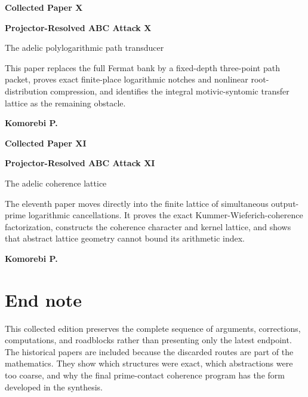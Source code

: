 \documentclass[11pt,openany]{book}
\theoremstyle{definition}
\theoremstyle{remark}
\newcommand{\PaperDivider}[4]{%
\clearpage
\thispagestyle{empty}
\vspace*{0.85in}
{\color{Blue}\Large\bfseries #1\par}
\vspace{0.16in}
{\Huge\bfseries #2\par}
\vspace{0.16in}
{\Large\color{Muted} #3\par}
\vspace{0.40in}
\begin{minipage}{0.88\textwidth}
\large #4
\end{minipage}
\vfill
{\large\bfseries Komorebi P.\par}
\clearpage}
\begin{document}
\PaperDivider{Collected Paper X}{Projector-Resolved ABC Attack X}{The adelic polylogarithmic path transducer}{This paper replaces the full Fermat bank by a fixed-depth three-point path packet, proves exact finite-place logarithmic notches and nonlinear root-distribution compression, and identifies the integral motivic-syntomic transfer lattice as the remaining obstacle.}


\PaperDivider{Collected Paper XI}{Projector-Resolved ABC Attack XI}{The adelic coherence lattice}{The eleventh paper moves directly into the finite lattice of simultaneous output-prime logarithmic cancellations. It proves the exact Kummer-Wieferich-coherence factorization, constructs the coherence character and kernel lattice, and shows that abstract lattice geometry cannot bound its arithmetic index.}


\backmatter
\chapter*{End note}
This collected edition preserves the complete sequence of arguments, corrections, computations, and roadblocks rather than presenting only the latest endpoint. The historical papers are included because the discarded routes are part of the mathematics. They show which structures were exact, which abstractions were too coarse, and why the final prime-contact coherence program has the form developed in the synthesis.
\end{document}
